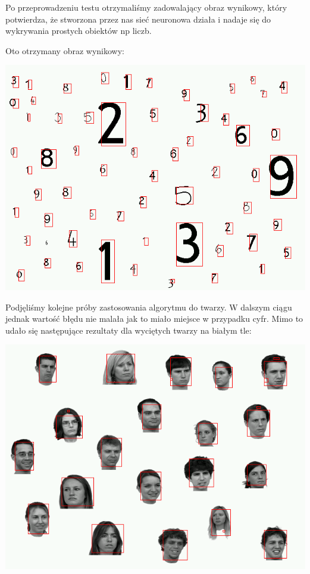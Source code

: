 \documentclass[11pt,a4paper]{article}
\begin{document}
Po przeprowadzeniu testu otrzymaliśmy zadowalający obraz wynikowy, który potwierdza, że stworzona przez nas 
sieć neuronowa działa i nadaje się do wykrywania prostych obiektów np liczb.

Oto otrzymany obraz wynikowy:

\begin{center}
\includegraphics[scale=0.35]{wynik}
\end{center}

Podjęliśmy kolejne próby zastosowania algorytmu do twarzy. W dalszym ciągu jednak wartość błędu nie malała jak to miało miejsce w przypadku cyfr. Mimo to udało się następujące rezultaty dla wyciętych twarzy na białym tle:

\begin{center}
\includegraphics[scale=0.35]{wynik_twarze}
\end{center}
\end{document}
